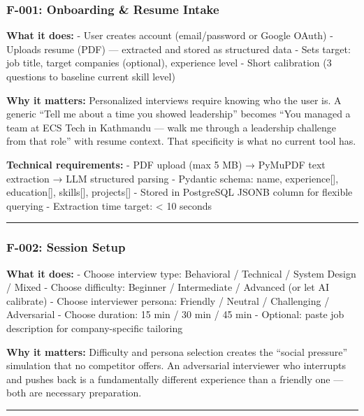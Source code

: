 \documentclass[
  11pt,
]{article}
\begin{document}
\hypertarget{f-001-onboarding-resume-intake}{%
\subsubsection{F-001: Onboarding \& Resume
Intake}\label{f-001-onboarding-resume-intake}}

\textbf{What it does:} - User creates account (email/password or Google
OAuth) - Uploads resume (PDF) --- extracted and stored as structured
data - Sets target: job title, target companies (optional), experience
level - Short calibration (3 questions to baseline current skill level)

\textbf{Why it matters:} Personalized interviews require knowing who the
user is. A generic ``Tell me about a time you showed leadership''
becomes ``You managed a team at ECS Tech in Kathmandu --- walk me
through a leadership challenge from that role'' with resume context.
That specificity is what no current tool has.

\textbf{Technical requirements:} - PDF upload (max 5 MB) → PyMuPDF text
extraction → LLM structured parsing - Pydantic schema: name,
experience{[}{]}, education{[}{]}, skills{[}{]}, projects{[}{]} - Stored
in PostgreSQL JSONB column for flexible querying - Extraction time
target: \textless{} 10 seconds

\begin{center}\rule{0.5\linewidth}{0.5pt}\end{center}

\hypertarget{f-002-session-setup}{%
\subsubsection{F-002: Session Setup}\label{f-002-session-setup}}

\textbf{What it does:} - Choose interview type: Behavioral / Technical /
System Design / Mixed - Choose difficulty: Beginner / Intermediate /
Advanced (or let AI calibrate) - Choose interviewer persona: Friendly /
Neutral / Challenging / Adversarial - Choose duration: 15 min / 30 min /
45 min - Optional: paste job description for company-specific tailoring

\textbf{Why it matters:} Difficulty and persona selection creates the
``social pressure'' simulation that no competitor offers. An adversarial
interviewer who interrupts and pushes back is a fundamentally different
experience than a friendly one --- both are necessary preparation.

\begin{center}\rule{0.5\linewidth}{0.5pt}\end{center}
\end{document}
